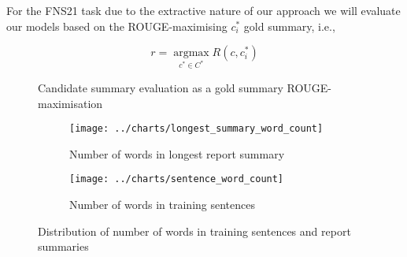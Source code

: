 For the FNS21 task due to the extractive nature of our approach we will evaluate our models based on the ROUGE-maximising $c^{*}_{i}$ gold summary, i.e.,

\begin{figure}[h]
    \centering
    \begin{equation}\label{eq:rouge_max}
        r = \underset{c^{*} \in C^{*}}{\operatorname{argmax}} R(c, c^{*}_{i})
    \end{equation}
    \caption{Candidate summary evaluation as a gold summary ROUGE-maximisation}
    \label{fig:rouge_max}
\end{figure}

\begin{figure}[ht]
    \begin{subfigure}{0.49\textwidth}
        \centering        \texttt{[image: ../charts/longest\_summary\_word\_count]}
        \caption{Number of words in longest report summary}
        \label{fig:longest_summary_word_count}
    \end{subfigure}%
    \hfill
    \begin{subfigure}{0.49\textwidth}
        \centering
        \texttt{[image: ../charts/sentence\_word\_count]}
        \caption{Number of words in training sentences}
        \label{fig:sentence_word_count}
    \end{subfigure}
    \caption{Distribution of number of words in training sentences and report summaries}
    \label{fig:word_count}
\end{figure}